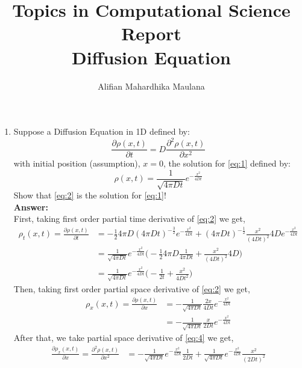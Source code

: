 \documentclass[a4paper,12pt]{article}
\title{Topics in Computational Science Report \\ Diffusion Equation}
\author{Alifian Mahardhika Maulana}
\begin{document}
\maketitle
\begin{enumerate}
	\item Suppose a Diffusion Equation in 1D defined by:
	\begin{equation}\label{eq:1}
	\frac{\partial \rho(x,t)}{\partial t} = D \frac{\partial^2 \rho(x,t)}{\partial x^2}
	\end{equation}
	with initial position (assumption), $x=0$, the solution for \eqref{eq:1} defined by:
	\begin{equation}\label{eq:2}
	\rho(x,t) = \frac{1}{\sqrt{4\pi D t}} e^{-\frac{x^2}{4Dt}}
	\end{equation}
	Show that \eqref{eq:2} is the solution for \eqref{eq:1}!\\
	\textbf{Answer:}\\
	First, taking first order partial time derivative of \eqref{eq:2} we get,
	\begin{equation}\label{eq:3}
	\begin{aligned}
	\rho_t(x,t) = \frac{\partial \rho(x,t)}{\partial t} &= -\frac{1}{2} 4\pi D (4\pi D t)^{-\frac{3}{2}} e^{-\frac{x^2}{4Dt}} + (4\pi D t)^{-\frac{1}{2}} \frac{x^2}{(4Dt)^2} 4D e^{-\frac{x^2}{4Dt}}\\
	&= \frac{1}{\sqrt{4\pi D t}} e^{-\frac{x^2}{4Dt}} \bigg( -\frac{1}{2} 4\pi D \frac{1}{4\pi Dt} + \frac{x^2}{(4Dt)^2}4D \bigg)\\
	&= \frac{1}{\sqrt{4\pi D t}} e^{-\frac{x^2}{4Dt}} \bigg( -\frac{1}{2t} + \frac{x^2}{4Dt^2} \bigg)
	\end{aligned}
	\end{equation}
	Then, taking first order partial space derivative of \eqref{eq:2} we get,
	\begin{equation}\label{eq:4}
	\begin{aligned}
	\rho_x(x,t) = \frac{\partial \rho(x,t)}{\partial x} &= -\frac{1}{\sqrt{4\pi D t}}\frac{2x}{4Dt} e^{-\frac{x^2}{4Dt}}\\
	&= -\frac{1}{\sqrt{4\pi D t}}\frac{x}{2Dt} e^{-\frac{x^2}{4Dt}}
	\end{aligned}
	\end{equation}
	After that, we take partial space derivative of \eqref{eq:4} we get,
	\begin{equation}\label{eq:5}
	\begin{aligned}
	\frac{\partial \rho_x(x,t)}{\partial x} = \frac{\partial^2 \rho(x,t)}{\partial x^2} &= -\frac{1}{\sqrt{4\pi D t}}e^{-\frac{x^2}{4Dt}} \frac{1}{2Dt} + \frac{1}{\sqrt{4\pi D t}} e^{-\frac{x^2}{4Dt}}\frac{x^2}{(2Dt)^2}\\

\end{aligned}
\end{equation}
\end{enumerate}
\end{document}
